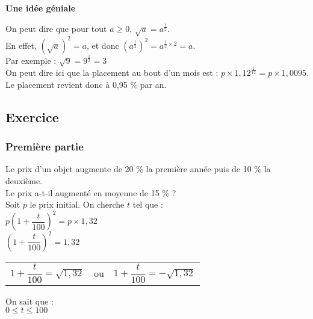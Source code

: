 \textbf{Une idée géniale}

On peut dire que pour tout $a \geq 0 $, $\sqrt{a} = a^{\frac{1}{2}}$. \\

En effet, $\left(\sqrt{a}\right)^2 = a$, et donc $\left(a^{\frac{1}{2}}\right)^2 = a^{\frac{1}{2} \times 2} = a$. \\

Par exemple : $\sqrt{9} = 9^{\frac{1}{2}} = 3$ \\

On peut dire ici que la placement au bout d'un mois est : $p \times 1,12^{\frac{1}{12}} = p \times 1,0095 $. \\

Le placement revient donc à 0,95 \% par an.

\newpage

\subsection{Exercice }

\subsubsection*{Première partie}

Le prix d'un objet augmente de 20 \% la première année puis de 10 \% la deuxième. \\

Le prix a-t-il augmenté en moyenne de 15 \% ? \\

Soit $p$ le prix initial. On cherche $t$ tel que : \\

$p\left(1 + \dfrac{t}{100} \right)^2 = p \times 1,32 $ \\

$\left(1 + \dfrac{t}{100} \right)^2 = 1,32 $ \\

\begin{tabular}{lcl}
$1 + \dfrac{t}{100} = \sqrt{1,32} $ & ou & $1 + \dfrac{t}{100} = -\sqrt{1,32} $ \\
\end{tabular}

\vspace{.3cm}

On sait que : \\

$ 0 \leq t \leq 100 $ \\


